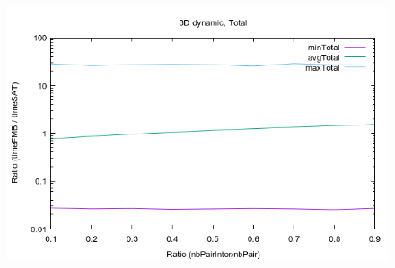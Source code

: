 \documentclass[12pt, a4paper]{article}
\begin{document}
\begin{scriptsize}
\begin{ttfamily}

\end{ttfamily}
\end{scriptsize}

\begin{center}
\begin{figure}[H]
\centering\includegraphics[width=12cm]{../Results/qualification3DTime.png}\\
\end{figure}
\end{center}
\end{document}
